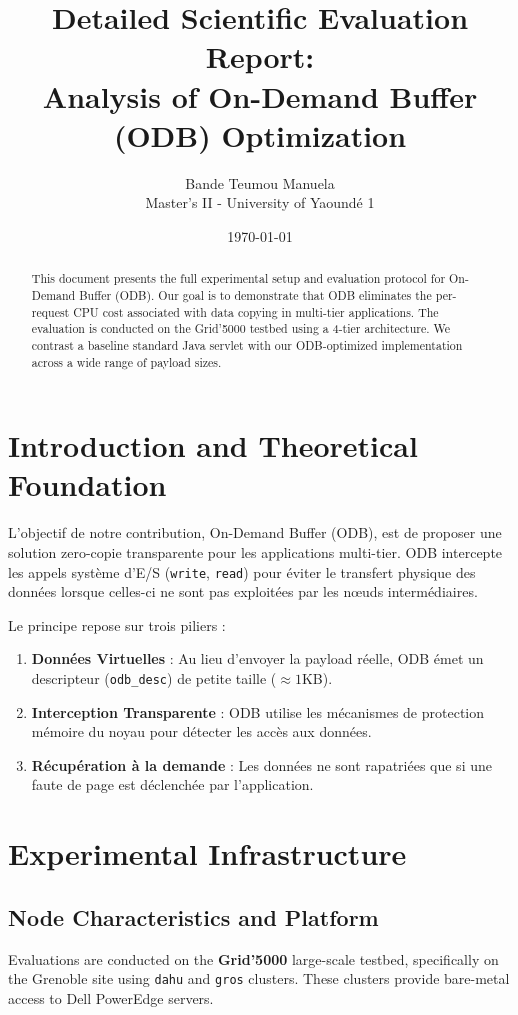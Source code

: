\documentclass[a4paper,12pt]{article}
\title{Detailed Scientific Evaluation Report: \\ Analysis of On-Demand Buffer (ODB) Optimization}
\author{Bande Teumou Manuela \\ Master's II - University of Yaoundé 1}
\date{\today}
\begin{document}
\maketitle

\begin{abstract}
This document presents the full experimental setup and evaluation protocol for On-Demand Buffer (ODB). Our goal is to demonstrate that ODB eliminates the per-request CPU cost associated with data copying in multi-tier applications. The evaluation is conducted on the Grid'5000 testbed using a 4-tier architecture. We contrast a baseline standard Java servlet with our ODB-optimized implementation across a wide range of payload sizes.
\end{abstract}

\tableofcontents
\newpage

\section{Introduction and Theoretical Foundation}
L’objectif de notre contribution, On-Demand Buffer (ODB), est de proposer une solution zero-copie transparente pour les applications multi-tier. ODB intercepte les appels système d'E/S (\texttt{write}, \texttt{read}) pour éviter le transfert physique des données lorsque celles-ci ne sont pas exploitées par les nœuds intermédiaires.

Le principe repose sur trois piliers :
\begin{enumerate}
    \item \textbf{Données Virtuelles} : Au lieu d'envoyer la payload réelle, ODB émet un descripteur (\texttt{odb\_desc}) de petite taille ($\approx 1$KB).
    \item \textbf{Interception Transparente} : ODB utilise les mécanismes de protection mémoire du noyau pour détecter les accès aux données.
    \item \textbf{Récupération à la demande} : Les données ne sont rapatriées que si une faute de page est déclenchée par l'application.
\end{enumerate}

\section{Experimental Infrastructure}

\subsection{Node Characteristics and Platform}
Evaluations are conducted on the \textbf{Grid'5000} large-scale testbed, specifically on the Grenoble site using \texttt{dahu} and \texttt{gros} clusters. These clusters provide bare-metal access to Dell PowerEdge servers.
\end{document}
